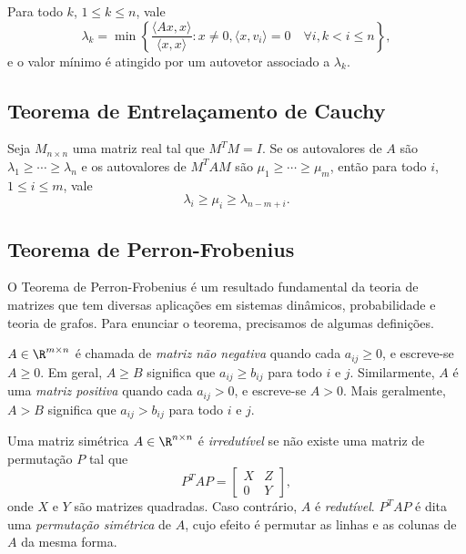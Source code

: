\documentclass{article}
\begin{document}
\begin{appendix}
\begin{cor}
    Para todo \(k\), \(1 \leq k \leq n\), vale
    \begin{equation}
        \lambda_k = \min\left\{\frac{\langle Ax, x \rangle}{\langle x, x \rangle} : x \neq 0, \langle x, v_i \rangle = 0 \quad\forall i, k < i \leq n\right\},
    \end{equation}
    e o valor mínimo é atingido por um autovetor associado a \(\lambda_k\).
\end{cor}

\subsection{Teorema de Entrelaçamento de Cauchy}

\begin{thm}
    Seja \(M_{n \times n}\) uma matriz real tal que \(M^TM = I\). Se os autovalores de \(A\) são \(\lambda_1 \geq \cdots \geq \lambda_n\) e os autovalores de \(M^T A M\) são \(\mu_1 \geq \cdots \geq \mu_m\), então para todo \(i\), \(1 \leq i \leq m\), vale
    \begin{equation}
        \lambda_i \geq \mu_i \geq \lambda_{n-m+i}.
    \end{equation}
\end{thm}

\subsection{Teorema de Perron-Frobenius}

O Teorema de Perron-Frobenius é um resultado fundamental da teoria de matrizes que tem diversas aplicações em sistemas dinâmicos, probabilidade e teoria de grafos. Para enunciar o teorema, precisamos de algumas definições.

\begin{defn}
    \(A \in \R^{m \times n}\) é chamada de \emph{matriz não negativa} quando cada \(a_{ij} \geq 0\), e escreve-se \(A \geq 0\). Em geral, \(A \geq B\) significa que \(a_{ij} \geq b_{ij}\) para todo \(i\) e \(j\). Similarmente, \(A\) é uma \emph{matriz positiva} quando cada \(a_{ij} > 0\), e escreve-se \(A > 0\). Mais geralmente, \(A > B\) significa que \(a_{ij} > b_{ij}\) para todo \(i\) e \(j\).    
\end{defn}

\begin{defn}
    Uma matriz simétrica \(A \in \R^{n \times n}\) é \emph{irredutível} se não existe uma matriz de permutação \(P\) tal que
    \[
        P^TAP = \begin{bmatrix}
            X & Z \\
            0 & Y
        \end{bmatrix},
    \]
    onde \(X\) e \(Y\) são matrizes quadradas. Caso contrário, \(A\) é \emph{redutível}. \(P^TAP\) é dita uma \emph{permutação simétrica} de \(A\), cujo efeito é permutar as linhas e as colunas de \(A\) da mesma forma.
\end{defn}


\end{appendix}
\end{document}
